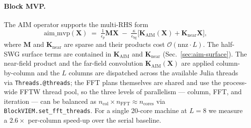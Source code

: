 \documentclass[11pt,a4paper]{article}
\begin{document}
\paragraph{Block MVP.}
The AIM operator supports the multi-RHS form
\[
  \text{aim\_mvp}(\mathbf{X}) \;=\;
  \tfrac{1}{\epsilon_p}\mathbf{M}\mathbf{X}
  \;-\;\tfrac{\kappa}{\epsilon_{\text{bg}}}\bigl[
  \mathbf{K}_{\text{AIM}}(\mathbf{X}) + \mathbf{K}_{\text{near}}\mathbf{X}\bigr],
\]
where $\mathbf{M}$ and $\mathbf{K}_{\text{near}}$ are sparse and their
products cost $\mathcal{O}(\text{nnz}\cdot L)$. The half-SWG surface
terms are contained in $\mathbf{K}_{\text{AIM}}$ and
$\mathbf{K}_{\text{near}}$ (Sec.~\ref{sec:aim-surface}). The near-field
product and the far-field convolution
$\mathbf{K}_{\text{AIM}}(\mathbf{X})$ are applied column-by-column and
the $L$ columns are dispatched across the available Julia threads via
\texttt{Threads.@threads}; the FFT plans themselves are shared and use
the process-wide FFTW thread pool, so the three levels of parallelism
--- column, FFT, and iteration --- can be balanced as
$n_{\text{col}}\!\times\!n_{\text{FFT}} \approx n_{\text{cores}}$ via
\texttt{BlockVIEM.set\_fft\_threads}. For a single 20-core machine at
$L=8$ we measure a $2.6\times$ per-column speed-up over the serial
baseline.
\end{document}

